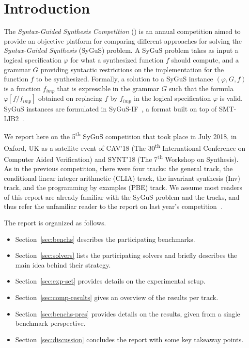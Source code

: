\section{Introduction}
\label{sec:intro}

The \emph{Syntax-Guided Synthesis Competition} (\comp) is an annual competition aimed to provide
an objective platform for comparing different approaches for solving the \emph{Syntax-Guided Synthesis} (SyGuS) problem.
A SyGuS problem takes as input a logical specification $\varphi$ for what a synthesized function $f$ should compute,
and a grammar $G$ providing syntactic restrictions on the implementation for the function $f$ to be synthesized.
Formally, a solution to a SyGuS instance $(\varphi,G,f)$ is a function $f_{imp}$ that is expressible in the grammar $G$
such that the formula $\varphi[f/f_{imp}]$ obtained on replacing $f$ by $f_{imp}$ in the logical specification $\varphi$ is valid.
SyGuS instances are formulated in SyGuS-IF~\cite{RaghothamanU14}, a format built on top of SMT-LIB2~\cite{smtlib}.

We report here on the 5\textsuperscript{th} SyGuS competition that took place in July 2018,
in Oxford, UK as a satellite event of CAV'18 (The 30\textsuperscript{th} International Conference on Computer Aided Verification)
and SYNT'18 (The 7\textsuperscript{th} Workshop on Synthesis).
As in the previous competition, there were four tracks:
the general track, the conditional linear integer arithmetic (CLIA) track, the invariant synthesis (Inv) track,
and the programming by examples (PBE) track.
We assume most readers of this report are already familiar with the SyGuS problem and the \comp{} tracks,
and thus refer the unfamiliar reader to the report on last year's competition~\cite{SyGuSComp17}.

The report is organized as follows.
\begin{itemize}
    \item Section~\ref{sec:benchs} describes the participating benchmarks.
    \item Section~\ref{sec:solvers} lists the participating solvers and briefly describes the main idea behind their strategy.
    \item Section~\ref{sec:exp-set} provides details on the experimental setup.
    \item Section~\ref{sec:comp-results} gives an overview of the results per track.
    \item Section~\ref{sec:benchs-pres} provides details on the results, given from a single benchmark perspective.
    \item Section~\ref{sec:discussion} concludes the report with some key takeaway points.
\end{itemize}
 